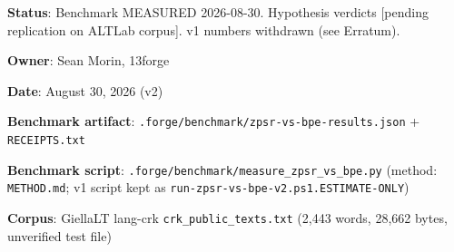 \documentclass[11pt,oneside]{article}
\begin{document}
\bigskip
\noindent
\textbf{Status}: Benchmark MEASURED 2026-08-30. Hypothesis verdicts [pending replication on ALTLab corpus]. v1 numbers withdrawn (see Erratum).

\textbf{Owner}: Sean Morin, 13forge

\textbf{Date}: August 30, 2026 (v2)

\textbf{Benchmark artifact}: \texttt{.forge/benchmark/zpsr-vs-bpe-results.json} + \texttt{RECEIPTS.txt}

\textbf{Benchmark script}: \texttt{.forge/benchmark/measure\_zpsr\_vs\_bpe.py} (method: \texttt{METHOD.md}; v1 script kept as \texttt{run-zpsr-vs-bpe-v2.ps1.ESTIMATE-ONLY})

\textbf{Corpus}: GiellaLT lang-crk \texttt{crk\_public\_texts.txt} (2,443 words, 28,662 bytes, unverified test file)
\end{document}
